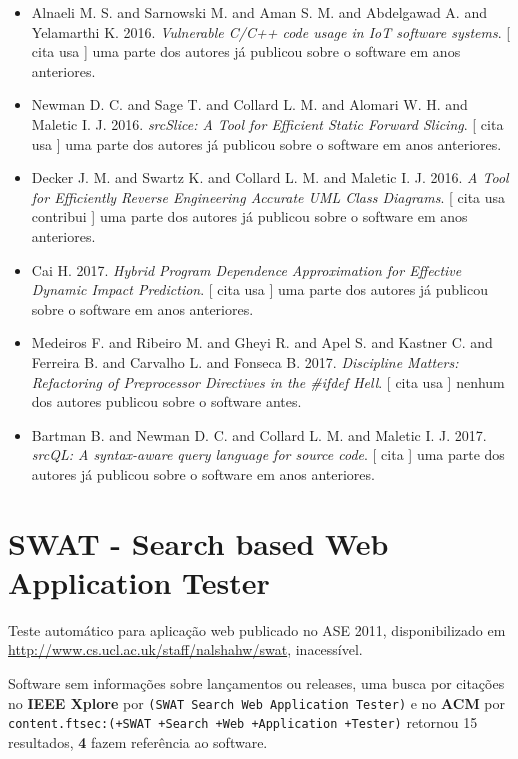\begin{itemize}
      [
          cita
          usa
      ]
uma parte dos autores já publicou sobre o software em anos anteriores.
\item Alnaeli M. S. and Sarnowski M. and Aman S. M. and Abdelgawad A. and Yelamarthi K.
      2016.
        \textit{ Vulnerable C/C++ code usage in IoT software systems}.
      [
          cita
          usa
      ]
uma parte dos autores já publicou sobre o software em anos anteriores.
\item Newman D. C. and Sage T. and Collard L. M. and Alomari W. H. and Maletic I. J.
      2016.
        \textit{ srcSlice: A Tool for Efficient Static Forward Slicing}.
      [
          cita
          usa
      ]
uma parte dos autores já publicou sobre o software em anos anteriores.
\item Decker J. M. and Swartz K. and Collard L. M. and Maletic I. J.
      2016.
        \textit{ A Tool for Efficiently Reverse Engineering Accurate UML Class Diagrams}.
      [
          cita
          usa
          contribui
      ]
uma parte dos autores já publicou sobre o software em anos anteriores.
\item Cai H.
      2017.
        \textit{ Hybrid Program Dependence Approximation for Effective Dynamic Impact Prediction}.
      [
          cita
          usa
      ]
uma parte dos autores já publicou sobre o software em anos anteriores.
\item Medeiros F. and Ribeiro M. and Gheyi R. and Apel S. and Kastner C. and Ferreira B. and Carvalho L. and Fonseca B.
      2017.
        \textit{ Discipline Matters: Refactoring of Preprocessor Directives in the \#ifdef Hell}.
      [
          cita
          usa
      ]
nenhum dos autores publicou sobre o software antes.
\item Bartman B. and Newman D. C. and Collard L. M. and Maletic I. J.
      2017.
        \textit{ srcQL: A syntax-aware query language for source code}.
      [
          cita
      ]
uma parte dos autores já publicou sobre o software em anos anteriores.
\end{itemize}
\section{SWAT - Search based Web Application Tester}

Teste automático para aplicação web
publicado no ASE 2011,
disponibilizado em \url{http://www.cs.ucl.ac.uk/staff/nalshahw/swat},
inacessível.

Software sem informações sobre lançamentos ou releases,
uma busca por citações no {\bf IEEE Xplore} por
\texttt{(SWAT Search Web Application Tester)}
e no {\bf ACM} por
\texttt{content.ftsec:(+SWAT +Search +Web +Application +Tester)}
retornou
15 resultados,
{\bf 4} fazem referência ao software.

